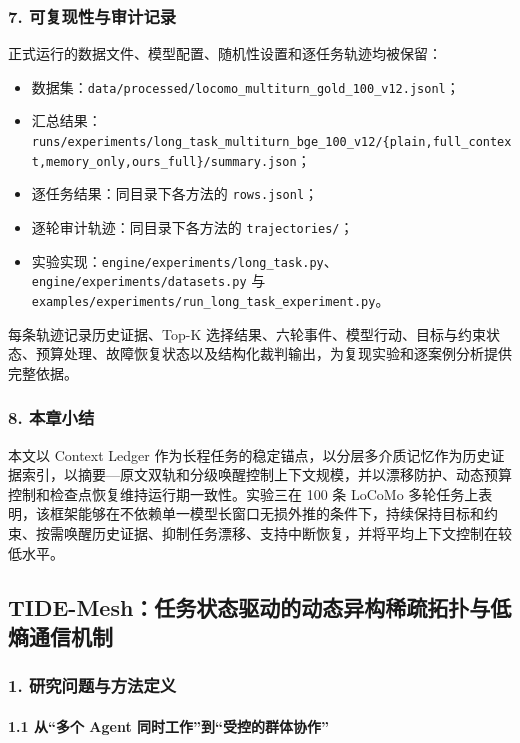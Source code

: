 \documentclass[UTF8,a4paper,12pt]{ctexart}
\providecommand{\tightlist}{%
  \setlength{\itemsep}{0pt}\setlength{\parskip}{0pt}}
\begin{document}
\subsubsection{7. 可复现性与审计记录}

正式运行的数据文件、模型配置、随机性设置和逐任务轨迹均被保留：

\begin{itemize}
\tightlist
\item
  数据集：\texttt{data/processed/locomo\_multiturn\_gold\_100\_v12.jsonl}；
\item
  汇总结果：\texttt{runs/experiments/long\_task\_multiturn\_bge\_100\_v12/\{plain,full\_context,memory\_only,ours\_full\}/summary.json}；
\item
  逐任务结果：同目录下各方法的 \texttt{rows.jsonl}；
\item
  逐轮审计轨迹：同目录下各方法的 \texttt{trajectories/}；
\item
  实验实现：\texttt{engine/experiments/long\_task.py}、\texttt{engine/experiments/datasets.py} 与 \texttt{examples/experiments/run\_long\_task\_experiment.py}。
\end{itemize}

每条轨迹记录历史证据、Top-K 选择结果、六轮事件、模型行动、目标与约束状态、预算处理、故障恢复状态以及结构化裁判输出，为复现实验和逐案例分析提供完整依据。

\subsubsection{8. 本章小结}

本文以 Context Ledger 作为长程任务的稳定锚点，以分层多介质记忆作为历史证据索引，以摘要—原文双轨和分级唤醒控制上下文规模，并以漂移防护、动态预算控制和检查点恢复维持运行期一致性。实验三在 100 条 LoCoMo 多轮任务上表明，该框架能够在不依赖单一模型长窗口无损外推的条件下，持续保持目标和约束、按需唤醒历史证据、抑制任务漂移、支持中断恢复，并将平均上下文控制在较低水平。

\subsection{TIDE-Mesh：任务状态驱动的动态异构稀疏拓扑与低熵通信机制}

\subsubsection{1. 研究问题与方法定义}

\paragraph{1.1 从``多个 Agent 同时工作''到``受控的群体协作''}
\end{document}
